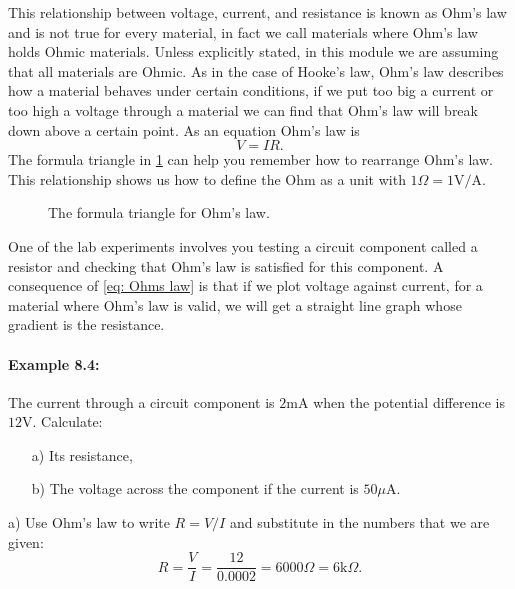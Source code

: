 \documentclass[a4paper,12pt]{book}
\begin{document}
This relationship between voltage, current, and resistance is known as Ohm's law and is not true for every material, in fact we call materials where Ohm's law holds Ohmic materials. Unless explicitly stated, in this module we are assuming that all materials are Ohmic. As in the case of Hooke's law, Ohm's law describes how a material behaves under certain conditions, if we put too big a current or too high a voltage through a material we can find that Ohm's law will break down above a certain point. As an equation Ohm's law is
\begin{equation}
V=IR.
\label{eq: Ohms law}
\end{equation}
The formula triangle in \cref{fig: Ohms law} can help you remember how to rearrange Ohm's law. This relationship shows us how to define the Ohm as a unit with $1\Omega=1\text{V/A}$.

\begin{figure}[ht]
    \centering
   \large {}
    \caption{The formula triangle for Ohm's law. }
    \label{fig: Ohms law}
\end{figure}

One of the lab experiments involves you testing a circuit component called a resistor and checking that Ohm's law is satisfied for this component. A consequence of \cref{eq: Ohms law} is that if we plot voltage against current, for a material where Ohm's law is valid, we will get a straight line graph whose gradient is the resistance.

\paragraph{Example 8.4:} The current through a circuit component is $2\text{mA}$ when the potential difference is $12\text{V}$. Calculate:
\begin{itemize}
\setlength{\itemsep}{-5pt}
    \item[a)] Its resistance,
    \item[b)] The voltage across the component if the current is $50\mu\text{A}$.
\end{itemize}

a) Use Ohm's law to write $R=V/I$ and substitute in the numbers that we are given:
\begin{equation*}
R=\frac{V}{I}=\frac{12}{0.0002}=6000\Omega = 6\text{k}\Omega.
\end{equation*}
\end{document}
